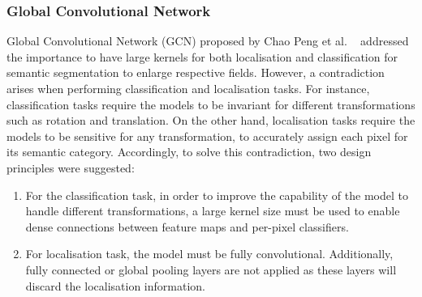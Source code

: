 \subsubsection{Global Convolutional Network}
Global Convolutional Network (GCN) proposed by Chao Peng et al. 
~\cite{Peng2017} addressed the importance to have large kernels for both 
localisation and classification for semantic segmentation to enlarge 
respective fields.
However, a contradiction arises when performing classification and localisation 
tasks. 
For instance, classification tasks require the models to be invariant for 
different transformations such as rotation and translation.
On the other hand, localisation tasks require the models to be sensitive for 
any transformation, to accurately assign each pixel for its semantic category.
Accordingly, to solve this contradiction, two design principles were suggested: 
\begin{enumerate}
	\item For the classification task, in order to improve the capability of 
	the model to handle different transformations, a large kernel size must be 
	used to enable dense connections between feature maps and per-pixel 
	classifiers.
	\item For localisation task, the model must be fully convolutional. 
	Additionally, fully connected or global pooling layers are not applied as 
	these layers will discard the localisation information. 
\end{enumerate}

